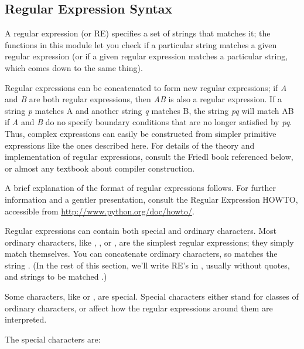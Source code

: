 \subsection{Regular Expression Syntax \label{re-syntax}}

A regular expression (or RE) specifies a set of strings that matches
it; the functions in this module let you check if a particular string
matches a given regular expression (or if a given regular expression
matches a particular string, which comes down to the same thing).

Regular expressions can be concatenated to form new regular
expressions; if \emph{A} and \emph{B} are both regular expressions,
then \emph{AB} is also a regular expression.  If a string \emph{p}
matches A and another string \emph{q} matches B, the string \emph{pq}
will match AB if \emph{A} and \emph{B} do no specify boundary
conditions that are no longer satisfied by \emph{pq}.  Thus, complex
expressions can easily be constructed from simpler primitive
expressions like the ones described here.  For details of the theory
and implementation of regular expressions, consult the Friedl book
referenced below, or almost any textbook about compiler construction.

A brief explanation of the format of regular expressions follows.  For
further information and a gentler presentation, consult the Regular
Expression HOWTO, accessible from \url{http://www.python.org/doc/howto/}.

Regular expressions can contain both special and ordinary characters.
Most ordinary characters, like , , or
, are the simplest regular expressions; they simply match
themselves.  You can concatenate ordinary characters, so 
matches the string .  (In the rest of this section, we'll
write RE's in , usually without quotes, and
strings to be matched .)

Some characters, like \character{|} or \character{(}, are special.
Special characters either stand for classes of ordinary characters, or
affect how the regular expressions around them are interpreted.

The special characters are:


